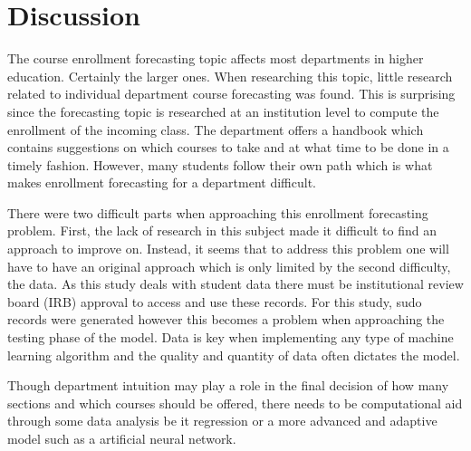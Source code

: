 \documentclass[12pt]{article}
\begin{document}

\section*{Discussion}
The course enrollment forecasting topic affects most departments in higher education. Certainly the larger ones. 
When researching this topic, little research related to individual department course forecasting was found. This 
is surprising since the forecasting topic is researched at an institution level to compute the enrollment of the incoming
class. The department offers a handbook which contains suggestions on which courses to take and at what time
to be done in a timely fashion. However, many students follow their own path which is what makes enrollment 
forecasting for a department difficult. 

There were two difficult parts when approaching this enrollment forecasting problem. First, the lack of research in 
this subject made it difficult to find an approach to improve on. Instead, it seems that to address this problem one 
will have to have an original approach which is only limited by the second difficulty, the data. As this study deals with 
student data there must be institutional review board (IRB) approval to access and use these records. For this study,
sudo records were generated however this becomes a problem when approaching the testing phase of the model.
Data is key when implementing any type of machine learning algorithm and the quality and quantity of data often
dictates the model.

Though department intuition may play a role in the final decision of how many sections and which courses should be
offered, there needs to be computational aid through some data analysis be it regression or a more advanced and 
adaptive model such as a artificial neural network.
\end{document}
